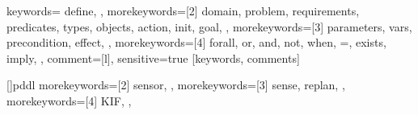 {
    keywords={
        define,
    },
    morekeywords={[2]
        domain,
        problem,
        requirements,
        predicates,
        types,
        objects,
        action,
        init,
        goal,
    },
    morekeywords={[3]
        parameters,
        vars,
        precondition,
        effect,
    },
    morekeywords={[4]
        forall,
        or,
        and,
        not,
        when,
        =,
        exists,
        imply,
    },
    comment=[l]{\;},
    sensitive=true
}[keywords, comments]

[]{pddl}
{
    morekeywords={[2]
      sensor,
    },
    morekeywords={[3]
      sense,
      replan,
    },
    morekeywords={[4]
      KIF,
    },
}